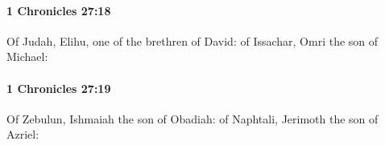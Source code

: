 		\paragraph{1 Chronicles 27:18} %
			\label{1CHRONICLES-27-18}

			Of Judah, Elihu, one of the brethren of David: of Issachar, Omri the son of Michael:


		\paragraph{1 Chronicles 27:19} %
			\label{1CHRONICLES-27-19}

			Of Zebulun, Ishmaiah the son of Obadiah: of Naphtali, Jerimoth the son of Azriel:


